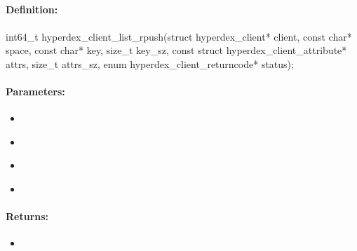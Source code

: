 \pagebreak
\subsection{}
\label{api:c:list_rpush}


\paragraph{Definition:}
\begin{ccode}
int64_t hyperdex_client_list_rpush(struct hyperdex_client* client,
        const char* space,
        const char* key, size_t key_sz,
        const struct hyperdex_client_attribute* attrs, size_t attrs_sz,
        enum hyperdex_client_returncode* status);
\end{ccode}

\paragraph{Parameters:}
\begin{itemize}[noitemsep]
\item {}\\

\item {}\\

\item {}\\

\item {}\\

\end{itemize}

\paragraph{Returns:}
\begin{itemize}[noitemsep]
\item {}\\

\end{itemize}

